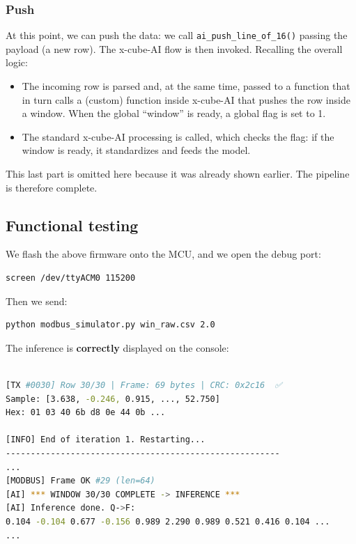 \subsubsection{Push}

At this point, we can push the data: we call \texttt{ai\_push\_line\_of\_16()} passing the payload (a new row). The x-cube-AI flow is then invoked. Recalling the overall logic:

\begin{itemize}
    \item The incoming row is parsed and, at the same time, passed to a function that in turn calls a (custom) function inside x-cube-AI that pushes the row inside a window. When the global ``window'' is ready, a global flag is set to 1.
    \item The standard x-cube-AI processing is called, which checks the flag: if the window is ready, it standardizes and feeds the model.
\end{itemize}

This last part is omitted here because it was already shown earlier. The pipeline is therefore complete.

\subsection{Functional testing}

We flash the above firmware onto the MCU, and we open the debug port:

\begin{verbatim}
screen /dev/ttyACM0 115200
\end{verbatim}

Then we send:

\begin{verbatim}
python modbus_simulator.py win_raw.csv 2.0
\end{verbatim}

The inference is \textbf{correctly} displayed on the console:

\begin{lstlisting}[language=bash]

[TX #0030] Row 30/30 | Frame: 69 bytes | CRC: 0x2c16  ✅
Sample: [3.638, -0.246, 0.915, ..., 52.750]
Hex: 01 03 40 6b d8 0e 44 0b ...

[INFO] End of iteration 1. Restarting...
-------------------------------------------------------
...
[MODBUS] Frame OK #29 (len=64)
[AI] *** WINDOW 30/30 COMPLETE -> INFERENCE ***
[AI] Inference done. Q->F:
0.104 -0.104 0.677 -0.156 0.989 2.290 0.989 0.521 0.416 0.104 ...
...

\end{lstlisting}

